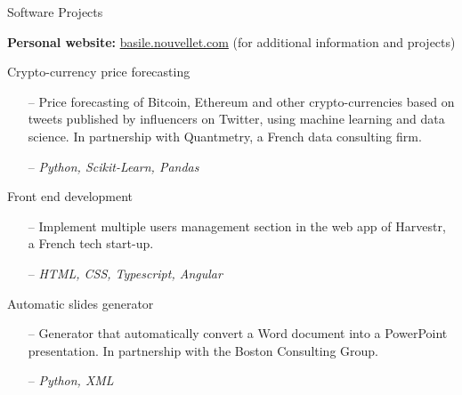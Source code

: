 \documentclass[]{mcdowellcv}
\begin{document}
    \begin{cvsection}{Software Projects}

        \hspace{4pt} \textbf{Personal website:} \url{basile.nouvellet.com} (\small for additional information and projects)

        \begin{cvsubsection}{Crypto-currency price forecasting}{}{}
            \begin{itemize}
                \item[--] Price forecasting of Bitcoin, Ethereum and other crypto-currencies based on tweets published by influencers on Twitter, using machine learning and data science. In partnership with Quantmetry, a French data consulting firm.
                \item[--] \textit{Python, Scikit-Learn, Pandas}
            \end{itemize}
        \end{cvsubsection}

        \begin{cvsubsection}{Front end development}{}{}
            \begin{itemize}
                \item[--] Implement multiple users management section in the web app of Harvestr, a French tech start-up.
                \item[--] \textit{HTML, CSS, Typescript, Angular}
            \end{itemize}
        \end{cvsubsection}

        \begin{cvsubsection}{Automatic slides generator}{}{}
            \begin{itemize}
                \item[--] Generator that automatically convert a Word document into a PowerPoint presentation. In partnership with the Boston Consulting Group.
                \item[--] \textit{Python, XML}
            \end{itemize}
        \end{cvsubsection}

    \end{cvsection}
\end{document}
